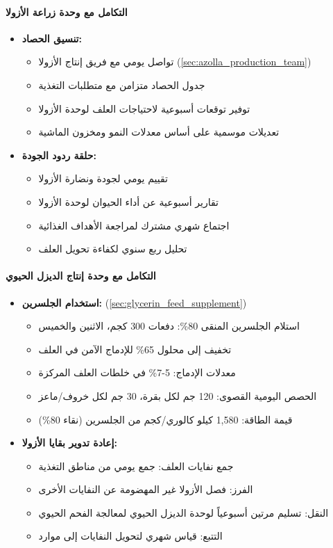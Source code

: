 \paragraph{التكامل مع وحدة زراعة الأزولا}
\begin{itemize}
    \item \textbf{تنسيق الحصاد:}
    \begin{itemize}
        \item تواصل يومي مع فريق إنتاج الأزولا (\ref{sec:azolla_production_team})
        \item جدول الحصاد متزامن مع متطلبات التغذية
        \item توفير توقعات أسبوعية لاحتياجات العلف لوحدة الأزولا
        \item تعديلات موسمية على أساس معدلات النمو ومخزون الماشية
    \end{itemize}
    \item \textbf{حلقة ردود الجودة:}
    \begin{itemize}
        \item تقييم يومي لجودة ونضارة الأزولا
        \item تقارير أسبوعية عن أداء الحيوان لوحدة الأزولا
        \item اجتماع شهري مشترك لمراجعة الأهداف الغذائية
        \item تحليل ربع سنوي لكفاءة تحويل العلف
    \end{itemize}
\end{itemize}

\paragraph{التكامل مع وحدة إنتاج الديزل الحيوي}
\begin{itemize}
    \item \textbf{استخدام الجلسرين:} (\ref{sec:glycerin_feed_supplement})
    \begin{itemize}
        \item استلام الجلسرين المنقى 80\%: دفعات 300 كجم، الاثنين والخميس
        \item تخفيف إلى محلول 65\% للإدماج الآمن في العلف
        \item معدلات الإدماج: 5-7\% في خلطات العلف المركزة
        \item الحصص اليومية القصوى: 120 جم لكل بقرة، 30 جم لكل خروف/ماعز
        \item قيمة الطاقة: 1,580 كيلو كالوري/كجم من الجلسرين (نقاء 80\%)
    \end{itemize}
    \item \textbf{إعادة تدوير بقايا الأزولا:}
    \begin{itemize}
        \item جمع نفايات العلف: جمع يومي من مناطق التغذية
        \item الفرز: فصل الأزولا غير المهضومة عن النفايات الأخرى
        \item النقل: تسليم مرتين أسبوعياً لوحدة الديزل الحيوي لمعالجة الفحم الحيوي
        \item التتبع: قياس شهري لتحويل النفايات إلى موارد
    \end{itemize}
\end{itemize}

